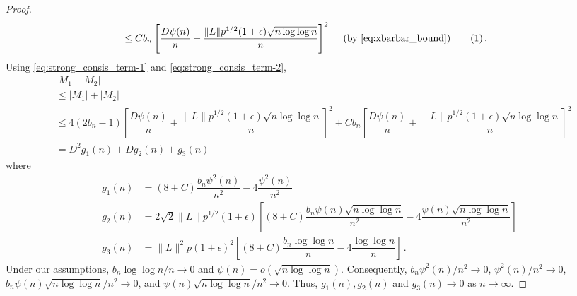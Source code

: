 \documentclass[11pt]{article}
\newcommand\numberthis{\addtocounter{equation}{1}\tag{\theequation}}
\theoremstyle{remark}
\begin{document}
\begin{proof}
\begin{align*}
    & \leq Cb_n\left[ \dfrac{D \psi(n)}{n} + \dfrac{\|L\| p^{1/2}(1+\epsilon)\sqrt{n \log\log n}}{n}  \right]^2 \quad \text{ (by \eqref{eq:xbarbar_bound})} \numberthis \label{eq:strong_consis_term-2} \,.
\end{align*}
%
%
%
%
Using \eqref{eq:strong_consis_term-1} and \eqref{eq:strong_consis_term-2},
\begin{align*}
  &|M_1 + M_2|\\
  & \leq |M_1| + |M_2|\\
  & \leq 4(2b_n - 1)\left[ \dfrac{D \psi(n)}{n} + \dfrac{\|L\| p^{1/2}(1+\epsilon)\sqrt{n \log\log n}}{n}  \right]^2 + Cb_n\left[ \dfrac{D \psi(n)}{n} + \dfrac{\|L\| p^{1/2}(1+\epsilon)\sqrt{n \log\log n}}{n}  \right]^2\\
  & = D^2g_1(n) + D g_2(n) + g_3(n)\,
\end{align*}
where
\begin{align*}
    g_1(n) &= (8 + C)\dfrac{b_n \psi^2(n)}{n^2} - 4\dfrac{\psi^2(n)}{n^2}\\
    g_2(n) &= 2\sqrt{2}\|L\|p^{1/2}(1+\epsilon)\left[(8 + C)\dfrac{b_n\psi(n)\sqrt{n\log \log n}}{n^2} - 4\dfrac{\psi(n)\sqrt{n\log \log n}}{n^2}\right]\\
    g_3(n) &= \|L\|^2 p (1+\epsilon)^2\left[(8 + C)\dfrac{b_n \log\log n}{n} - 4 \dfrac{\log \log n}{n}\right]\,.
\end{align*}
Under our assumptions, $b_n\log \log n /n \to 0$ and $\psi(n) = o(\sqrt{n \log \log n})$. Consequently, $b_n \psi^2(n)/n^2 \to 0$, $\psi^2(n)/n^2 \to 0$, ${b_n\psi(n)\sqrt{n\log \log n}/n^2} \to 0$, and $\psi(n) \sqrt{n \log \log n}/n^2 \to 0$. Thus, $g_1(n), g_2(n)$ and $g_3(n) \to 0$ as $n \to \infty$. 

\end{proof}
\end{document}
